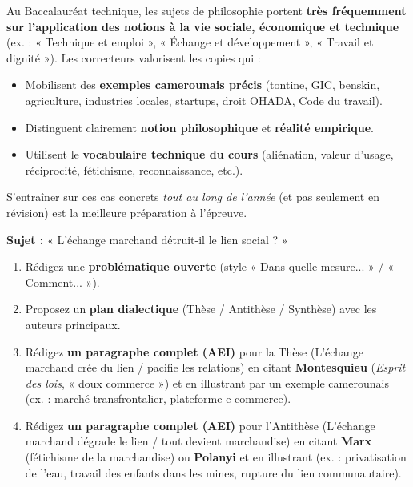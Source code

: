 \documentclass[11pt]{article}
\begin{document}
\begin{savaistu}
Au Baccalauréat technique, les sujets de philosophie portent \textbf{très fréquemment sur l'application des notions à la vie sociale, économique et technique} (ex. : « Technique et emploi », « Échange et développement », « Travail et dignité »). Les correcteurs valorisent les copies qui :
\begin{itemize}
    \item Mobilisent des \textbf{exemples camerounais précis} (tontine, GIC, benskin, agriculture, industries locales, startups, droit OHADA, Code du travail).
    \item Distinguent clairement \textbf{notion philosophique} et \textbf{réalité empirique}.
    \item Utilisent le \textbf{vocabulaire technique du cours} (aliénation, valeur d'usage, réciprocité, fétichisme, reconnaissance, etc.).
\end{itemize}
S'entraîner sur ces cas concrets \emph{tout au long de l'année} (et pas seulement en révision) est la meilleure préparation à l'épreuve.
\end{savaistu}

\begin{exercice}
\textbf{Sujet :} « L'échange marchand détruit-il le lien social ? »
\begin{enumerate}
    \item Rédigez une \textbf{problématique ouverte} (style « Dans quelle mesure... » / « Comment... »).
    \item Proposez un \textbf{plan dialectique} (Thèse / Antithèse / Synthèse) avec les auteurs principaux.
    \item Rédigez \textbf{un paragraphe complet (AEI)} pour la Thèse (L'échange marchand crée du lien / pacifie les relations) en citant \textbf{Montesquieu} (\emph{Esprit des lois}, « doux commerce ») et en illustrant par un exemple camerounais (ex. : marché transfrontalier, plateforme e-commerce).
    \item Rédigez \textbf{un paragraphe complet (AEI)} pour l'Antithèse (L'échange marchand dégrade le lien / tout devient marchandise) en citant \textbf{Marx} (fétichisme de la marchandise) ou \textbf{Polanyi} et en illustrant (ex. : privatisation de l'eau, travail des enfants dans les mines, rupture du lien communautaire).
\end{enumerate}
\end{exercice}
\end{document}
